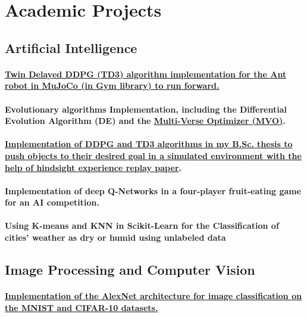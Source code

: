 \documentclass[a4paper]{article}
\begin{document}
\section{Academic Projects}

\subsection{Artificial Intelligence}

\paragraph{\href{https://github.com/ake1999/TD3_Ant_v4}{Twin Delayed DDPG (TD3) algorithm implementation for the Ant robot in MuJoCo (in Gym library) to run forward.}}
\paragraph{Evolutionary algorithms Implementation, including the Differential Evolution Algorithm (DE) and the \href{https://github.com/ake1999/MVO_MATLAB}{Multi-Verse Optimizer (MVO)}.}
\paragraph{\href{https://github.com/ake1999/aarm}{Implementation of DDPG and TD3 algorithms in my B.Sc. thesis to push objects to their desired goal in a simulated environment with the help of hindsight experience replay paper}.}
\paragraph{Implementation of deep Q-Networks in a four-player fruit-eating game for an AI competition.}
\paragraph{Using K-means and KNN in Scikit-Learn for the Classification of cities' weather as dry or humid using unlabeled data}
            
\newpage
\subsection{Image Processing and Computer Vision}

\paragraph{\href{https://github.com/ake1999/CNN_AlexNet}{Implementation of the AlexNet architecture for image classification on the MNIST and CIFAR-10 datasets.}}
\end{document}
